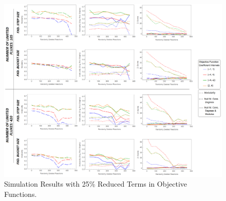 \begin{landscape}
	\begin{figure}[ht]
		\centering
		\vspace*{-1.5cm}
		\includegraphics[width=1.05\hsize]{../images/results-obj_func_terms_reduced25-simulation-results.png}
		\caption{Simulation Results with 25\% Reduced Terms in Objective Functions.}
		\label{figure-supplements-obj_func-terms-reduced25}
	\end{figure}
\end{landscape}
